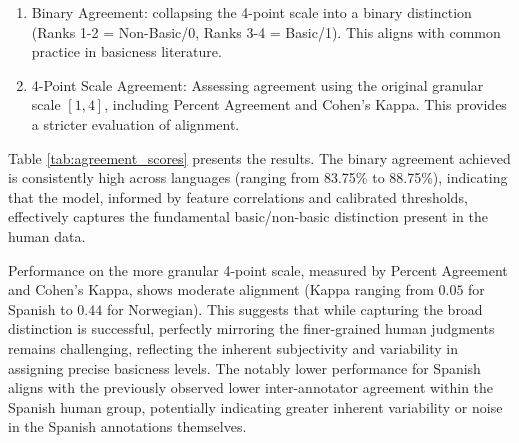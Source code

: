 \documentclass[preprint,12pt,authoryear]{elsarticle}
\begin{document}
\begin{enumerate}
    \item Binary Agreement: collapsing the 4-point scale into a binary distinction (Ranks 1-2 = Non-Basic/0, Ranks 3-4 = Basic/1). This aligns with common practice in basicness literature.
    \item 4-Point Scale Agreement: Assessing agreement using the original granular scale $[1,4]$, including Percent Agreement and Cohen's Kappa. This provides a stricter evaluation of alignment.
\end{enumerate}

Table \ref{tab:agreement_scores} presents the results. The binary agreement achieved is consistently high across languages (ranging from 83.75\% to 88.75\%), indicating that the model, informed by feature correlations and calibrated thresholds, effectively captures the fundamental basic/non-basic distinction present in the human data.

Performance on the more granular 4-point scale, measured by Percent Agreement and Cohen's Kappa, shows moderate alignment (Kappa ranging from $0.05$ for Spanish to $0.44$ for Norwegian). This suggests that while capturing the broad distinction is successful, perfectly mirroring the finer-grained human judgments remains challenging, reflecting the inherent subjectivity and variability in assigning precise basicness levels. The notably lower performance for Spanish aligns with the previously observed lower inter-annotator agreement within the Spanish human group, potentially indicating greater inherent variability or noise in the Spanish annotations themselves.

\end{document}
